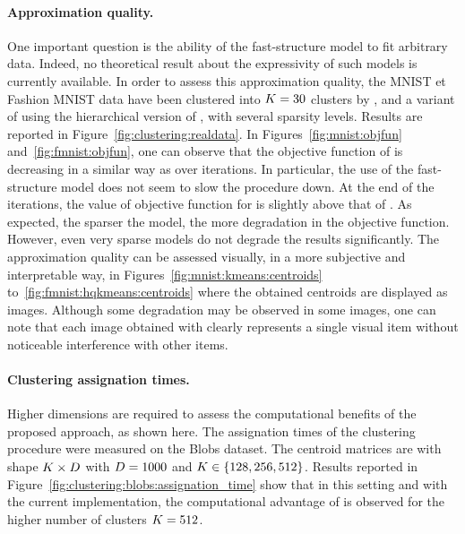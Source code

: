 

\paragraph{Approximation quality.} One important question is the ability of the fast-structure model to fit arbitrary data.
Indeed, no theoretical result about the expressivity of such models is currently available.
In order to assess this approximation quality, the MNIST et Fashion MNIST data have been clustered into $K=30$ clusters by \kmeans, \qkmeans and a variant of \qkmeans using the hierarchical version of \palm, with several sparsity levels.
Results are reported in Figure~\ref{fig:clustering:realdata}.
In Figures~\ref{fig:mnist:objfun} and~\ref{fig:fmnist:objfun}, one can observe that the objective function of \qkmeans is decreasing in a similar way as \kmeans over iterations.
In particular, the use of the fast-structure model does not seem to slow the procedure down.
At the end of the iterations, the value of objective function for \qkmeans is slightly above that of \kmeans.
As expected, the sparser the model, the more degradation in the objective function.
However, even very sparse models do not degrade the results significantly.
The approximation quality can be assessed visually, in a more subjective and interpretable way, in Figures~\ref{fig:mnist:kmeans:centroids} to~\ref{fig:fmnist:hqkmeans:centroids} where the obtained centroids are displayed as images.
Although some degradation may be observed in some images, one can note that each image obtained with \qkmeans clearly represents a single visual item without noticeable interference with other items.

\paragraph{Clustering assignation times.}
Higher dimensions are required to assess the computational benefits of the proposed approach, as shown here.
The assignation times of the clustering procedure were measured on the Blobs dataset.
The centroid matrices are with shape $K \times D$ with $D=1000$  and $K\in\left \lbrace 128, 256, 512\right \rbrace$.
Results reported in Figure~\ref{fig:clustering:blobs:assignation_time} show that in this setting and with the current implementation, the computational advantage of \qkmeans is observed for the higher number of clusters $K=512$.

